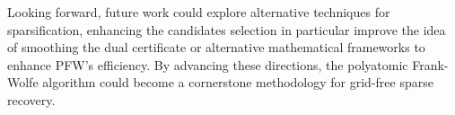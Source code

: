 \documentclass[a4paper,12pt,oneside]{report}
\theoremstyle{named}
\begin{document}
Looking forward, future work could explore alternative techniques for sparsification, enhancing the candidates selection in particular improve the idea of smoothing the dual certificate or alternative mathematical frameworks to enhance PFW’s efficiency. By advancing these directions, the polyatomic Frank-Wolfe algorithm could become a cornerstone methodology for grid-free sparse recovery.




{}

\end{document}

